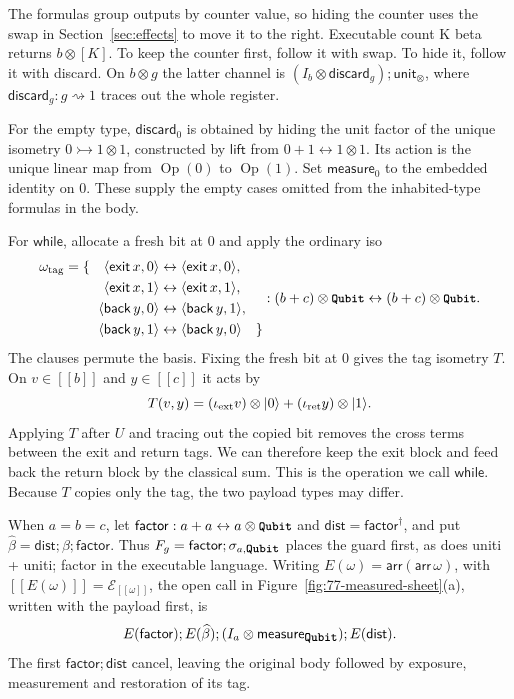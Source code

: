 \documentclass[acmsmall,screen,review,anonymous,nonacm]{acmart}
\newcommand{\storyinlinekwface}{\storyinlineface\bfseries}}
\newcommand{\storyinlineface}{\small\ttfamily}
\newcommand{\storyinlinekwface}{\small\ttfamily\bfseries}
\newcommand{\kw}[1]{\textnormal{\storyinlinekwface #1}}
\newcommand{\code}[1]{\textnormal{\storyinlineface #1}}
\providecommand{\llbracket}{[\![}
\providecommand{\rrbracket}{]\!]}
\newcommand{\sem}[1]{\llbracket #1 \rrbracket}
\newcommand{\ket}[1]{\lvert #1\rangle}
\numberwithin{equation}{section}
\newcommand{\chan}[1]{\mathcal E_{#1}}
\begin{document}
The formulas group outputs by counter value, so hiding the counter uses
the swap in Section~\ref{sec:effects} to move it to the right.
Executable \code{count K beta} returns $b\otimes[K]$. To keep the
counter first, follow it with \code{swap}. To hide it, follow it with
\code{discard}. On $b\otimes g$ the latter channel is
$(I_b\otimes\mathsf{discard}_g);\mathsf{unit}_\otimes$, where
$\mathsf{discard}_g:g\rightsquigarrow1$ traces out the whole register.

For the empty type, $\mathsf{discard}_0$ is obtained by hiding the
unit factor of the unique isometry $0\rightarrowtail1\otimes1$,
constructed by $\mathsf{lift}$ from $0+1\leftrightarrow1\otimes1$.
Its action is the unique linear map from $\operatorname{Op}(0)$ to $\operatorname{Op}(1)$. Set
$\mathsf{measure}_0$ to the embedded identity on $0$. These supply
the empty cases omitted from the inhabited-type formulas in the body.

For $\mathsf{while}$, allocate a fresh bit at $0$ and apply the
ordinary iso
\[
\begin{aligned}
 \omega_{\rm tag}=\{\quad
 \langle\mathsf{exit}\,x,0\rangle&\leftrightarrow\langle\mathsf
{exit}\,x,0\rangle,\\
 \langle\mathsf{exit}\,x,1\rangle&\leftrightarrow\langle\mathsf
{exit}\,x,1\rangle,\\
 \langle\mathsf{back}\,y,0\rangle&\leftrightarrow\langle\mathsf
{back}\,y,1\rangle,\\
 \langle\mathsf{back}\,y,1\rangle&\leftrightarrow\langle\mathsf
{back}\,y,0\rangle\quad\}
 \end{aligned}
: (b+c)\otimes\kw{Qubit}\leftrightarrow(b+c)\otimes\kw{Qubit}.
\]
The clauses permute the basis. Fixing the fresh bit at $0$ gives the
tag isometry $T$. On $v\in\sem b$ and $y\in\sem c$ it acts by
\[
T(v,y)= (\iota_{\rm ext}v)\otimes\ket0+(\iota_{\rm ret}y)\otimes\ket1
.
\]
Applying $T$ after $U$ and tracing out the copied bit removes the cross terms
between the exit and return tags. We can therefore keep the exit block and feed
back the return block by the classical sum. This is the operation we call
$\mathsf{while}$. Because $T$ copies only the tag, the two payload types may differ.

When $a=b=c$, let $\mathsf{factor}:a+a\leftrightarrow
a\otimes\kw{Qubit}$ and $\mathsf{dist}=\mathsf{factor}^\dagger$, and
put
$\widehat\beta=\mathsf{dist};\beta;\mathsf{factor}$.
Thus $F_g=\mathsf{factor};\sigma_{a,\kw{Qubit}}$ places the guard first, as does \code{uniti + uniti; factor} in the executable language.
Writing $E(\omega)=\mathsf{arr}(\mathsf{arr}\,\omega)$, with
$\sem{E(\omega)}=\chan{\sem\omega}$, the open call in Figure~\ref{fig:77-measured-sheet}(a), written with the payload first, is
\[
E(\mathsf{factor});E(\widehat\beta);
(I_a\otimes\mathsf{measure}_{\kw{Qubit}});E(\mathsf{dist}).
\]
The first $\mathsf{factor};\mathsf{dist}$ cancel, leaving the
original body followed by exposure, measurement and restoration of
its tag.
\end{document}
